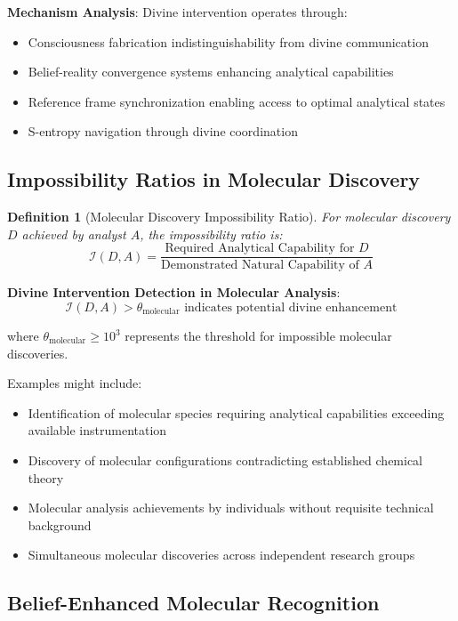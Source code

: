 \documentclass[11pt,a4paper]{article}
\newtheorem{definition}[theorem]{Definition}
\theoremstyle{remark}
\begin{document}
\textbf{Mechanism Analysis}: Divine intervention operates through:
\begin{itemize}
\item Consciousness fabrication indistinguishability from divine communication
\item Belief-reality convergence systems enhancing analytical capabilities
\item Reference frame synchronization enabling access to optimal analytical states
\item S-entropy navigation through divine coordination
\end{itemize}

\subsection{Impossibility Ratios in Molecular Discovery}

\begin{definition}[Molecular Discovery Impossibility Ratio]
For molecular discovery $D$ achieved by analyst $A$, the impossibility ratio is:
$$\mathcal{I}(D,A) = \frac{\text{Required Analytical Capability for } D}{\text{Demonstrated Natural Capability of } A}$$
\end{definition}

\textbf{Divine Intervention Detection in Molecular Analysis}:
$$\mathcal{I}(D,A) > \theta_{\text{molecular}} \text{ indicates potential divine enhancement}$$

where $\theta_{\text{molecular}} \geq 10^3$ represents the threshold for impossible molecular discoveries.

Examples might include:
\begin{itemize}
\item Identification of molecular species requiring analytical capabilities exceeding available instrumentation
\item Discovery of molecular configurations contradicting established chemical theory
\item Molecular analysis achievements by individuals without requisite technical background
\item Simultaneous molecular discoveries across independent research groups
\end{itemize}

\subsection{Belief-Enhanced Molecular Recognition}
\end{document}
